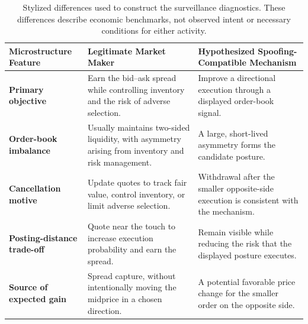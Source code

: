 \documentclass[11pt]{article}
\newenvironment{review}{\begingroup\color{blue}}{\endgroup}
\begin{document}
\begin{table}[htbp]
\centering
\caption{Stylized differences used to construct the surveillance diagnostics. These differences describe economic
benchmarks, not observed intent or necessary conditions for either activity.}
\label{tab:surveillance-models}
\renewcommand{\arraystretch}{1.4}
\setlength{\tabcolsep}{8pt}

\begin{tabularx}{\textwidth}{
    >{\raggedright\arraybackslash\bfseries}p{}
    >{\raggedright\arraybackslash}X
    >{\raggedright\arraybackslash}X
}
\toprule
\rowcolor{gray!15}
\textbf{Microstructure Feature} & \textbf{Legitimate Market Maker} & \textbf{Hypothesized Spoofing-Compatible Mechanism} \\
\midrule
Primary objective
& Earn the bid--ask spread while controlling inventory and \begin{review}the risk of adverse selection\end{review}.
& Improve a directional execution through a displayed order-book signal. \\

Order-book imbalance
& Usually maintains two-sided liquidity, with asymmetry arising from inventory and risk management.
& A large, short-lived asymmetry forms the candidate posture. \\

Cancellation motive
& Update quotes to track fair value, control inventory, or limit adverse selection.
& Withdrawal after the smaller opposite-side execution is consistent with the mechanism. \\

Posting-distance trade-off
& Quote near the touch to increase execution probability and earn the spread.
& Remain visible while reducing the risk that the displayed posture executes. \\

Source of expected gain
& Spread capture, without intentionally moving the midprice in a chosen direction.
& A potential favorable price change for the smaller order on the opposite side. \\
\bottomrule
\end{tabularx}
\end{table}
\end{document}
